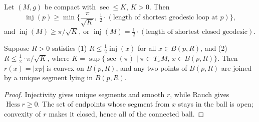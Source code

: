 \begin{lemma}
  \label{lem:pet-ch6-klingenberg-injectivity-estimate}


  Let $(M,g)$ be compact with $\sec\le K$, $K>0$. Then
  \[
    \operatorname{inj}(p)\ge\min\Big\{\frac{\pi}{\sqrt K},\ \tfrac12\cdot
    (\text{length of shortest geodesic loop at }p)\Big\},
  \]
  and $\operatorname{inj}(M)\ge\pi/\sqrt K$, or
  $\operatorname{inj}(M)=\tfrac12\cdot(\text{length of shortest closed geodesic})$.
\end{lemma}

\begin{theorem}
  \label{thm:pet-ch6-convexity-radius-criterion}


  Suppose $R>0$ satisfies (1) $R\le\tfrac12\operatorname{inj}(x)$ for all $x\in B(p,R)$,
  and (2) $R\le\tfrac12\cdot\pi/\sqrt K$, where
  $K=\sup\{\sec(\pi)\mid\pi\subset T_xM,\,x\in B(p,R)\}$. Then $r(x)=|xp|$ is
  convex on $B(p,R)$, and any two points of $B(p,R)$ are joined by a unique
  segment lying in $B(p,R)$.
\end{theorem}
\begin{proof}
  \sketch
  Injectivity gives unique segments and smooth \(r\), while Rauch gives \(\operatorname{Hess}r\ge0\). The set of endpoints whose segment from \(x\) stays in the ball is open; convexity of \(r\) makes it closed, hence all of the connected ball.
\end{proof}

